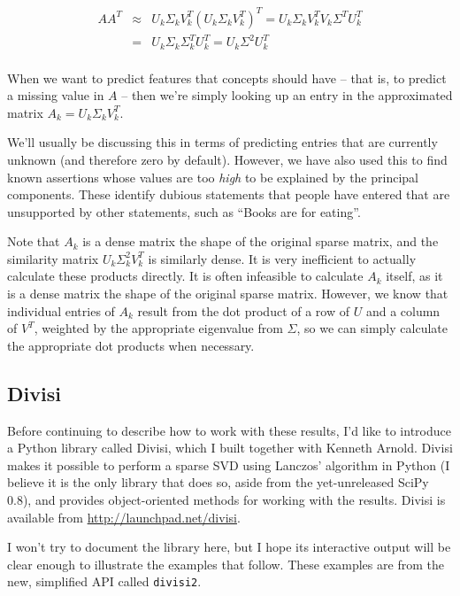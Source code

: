\documentclass[11pt]{article}
\begin{document}
\begin{eqnarray*}
AA^T &\approx& U_k \Sigma_k V^T_k (U_k \Sigma_k V^T_k)^T = U_k \Sigma_k V^T_k V_k \Sigma^T U^T_k\\
     &=& U_k \Sigma_k \Sigma^T_k U^T_k = U_k \Sigma^2 U^T_k\\
\end{eqnarray*}

When we want to predict features that concepts should have -- that is, to
predict a missing value in $A$ -- then we're simply looking up an entry in
the approximated matrix $A_k = U_k \Sigma_k V^T_k$.

We'll usually be discussing this in terms of predicting entries that are
currently unknown (and therefore zero by default). However, we have also used
this to find known assertions whose values are too {\em high} to be explained
by the principal components. These identify dubious statements that people have
entered that are unsupported by other statements, such as ``Books are for
eating''.

Note that $A_k$ is a dense matrix the shape of the original sparse matrix, and
the similarity matrix $U_k \Sigma^2_k V^T_k$ is similarly dense. It is very
inefficient to actually calculate these products directly.  It is often
infeasible to calculate $A_k$ itself, as it is a dense matrix the shape of the
original sparse matrix. However, we know that individual entries of $A_k$
result from the dot product of a row of $U$ and a column of $V^T$, weighted by
the appropriate eigenvalue from $\Sigma$, so we can simply calculate the
appropriate dot products when necessary.

\subsection{Divisi}
Before continuing to describe how to work with these results, I'd like to
introduce a Python library called Divisi, which I built together with Kenneth
Arnold. Divisi makes it possible to perform a sparse SVD using Lanczos'
algorithm in Python (I believe it is the only library that does so, aside from
the yet-unreleased SciPy 0.8), and provides object-oriented methods for working
with the results. Divisi is available from
\url{http://launchpad.net/divisi}.

I won't try to document the library here, but I hope its interactive output
will be clear enough to illustrate the examples that follow. These examples are
from the new, simplified API called {\tt divisi2}.
\end{document}
